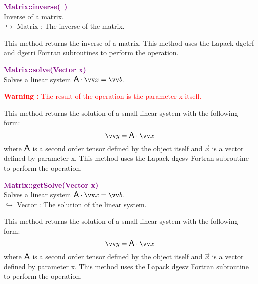 \textcolor{purple}{\textbf{Matrix::inverse(~)}}\label{Matrix::inverse()}\\
Inverse of a matrix.\\ \hspace*{10mm}$\hookrightarrow$ Matrix : The inverse of the matrix.

This method returns the inverse of a matrix.
This method uses the Lapack \textsf{dgetrf} and \textsf{dgetri} Fortran subroutines to perform the operation.

\textcolor{purple}{\textbf{Matrix::solve(Vector x)}}\label{Matrix::solve(Vector x)}\\
Solves a linear system $\A\cdot \overrightarrow{x} = \overrightarrow{b}$.

\hspace*{10mm}\textcolor{red}{\textbf{Warning :}  The result of the operation is the parameter x itsefl.}

This method returns the solution of a small linear system with the following form:
\begin{equation*}
\overrightarrow{y} = \A \cdot \overrightarrow{x}
\end{equation*}
where $\mbox{\large\ensuremath{\mathsf{A}}}$ is a second order tensor defined by the object itself and $\overrightarrow{x}$ is a vector defined by parameter x.
This method uses the Lapack \textsf{dgesv} Fortran subroutine to perform the operation.

\textcolor{purple}{\textbf{Matrix::getSolve(Vector x)}}\label{Matrix::getSolve(Vector x)}\\
Solves a linear system $\A\cdot \overrightarrow{x} = \overrightarrow{b}$.\\ \hspace*{10mm}$\hookrightarrow$ Vector : The solution of the linear system.

This method returns the solution of a small linear system with the following form:
\begin{equation*}
\overrightarrow{y} = \A \cdot \overrightarrow{x}
\end{equation*}
where $\mbox{\large\ensuremath{\mathsf{A}}}$ is a second order tensor defined by the object itself and $\overrightarrow{x}$ is a vector defined by parameter x.
This method uses the Lapack \textsf{dgesv} Fortran subroutine to perform the operation.

